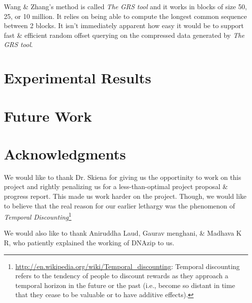 \documentclass[11pt]{article}
\begin{document}
Wang \& Zhang's method is called \textit{The GRS tool} and it works in
blocks of size 50, 25, or 10 million. It relies on being able to
compute the longest common sequence between 2 blocks. It isn't
immediately apparent how easy it would be to support fast \& efficient
random offset querying on the compressed data generated by \textit{The
  GRS tool}.

\section{Experimental Results}

\section{Future Work}

\section{Acknowledgments}

We would like to thank Dr. Skiena for giving us the opportinity to
work on this project and rightly penalizing us for a less-than-optimal
project proposal \& progress report. This made us work harder on the
project. Though, we would like to believe that the real reason for our
earlier lethargy was the phenomenon of \textit{Temporal
  Discounting}\footnote{\url{http://en.wikipedia.org/wiki/Temporal_discounting}:
  Temporal discounting refers to the tendency of people to discount
  rewards as they approach a temporal horizon in the future or the
  past (i.e., become so distant in time that they cease to be valuable
  or to have additive effects).}

We would also like to thank Aniruddha Laud, Gaurav menghani, \&
Madhava K R, who patiently explained the working of
DNAzip\cite{dnazip} to us.



\clearpage
\end{document}
